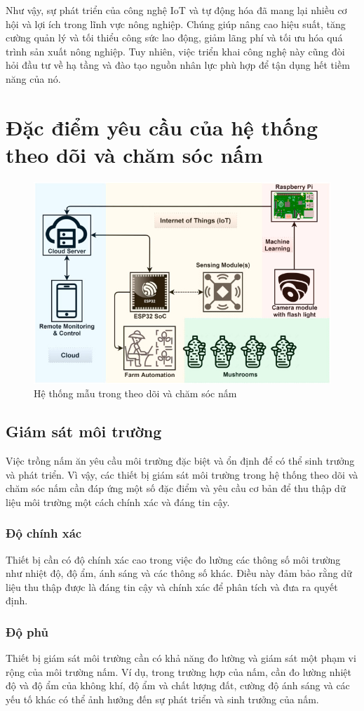 Như vậy, sự phát triển của công nghệ IoT và tự động hóa đã mang lại nhiều cơ hội và lợi ích trong lĩnh vực nông nghiệp. Chúng giúp nâng cao hiệu suất, tăng cường quản lý và tối thiểu công sức lao động, giảm lãng phí và tối ưu hóa quá trình sản xuất nông nghiệp. Tuy nhiên, việc triển khai công nghệ này cũng đòi hỏi đầu tư về hạ tầng và đào tạo nguồn nhân lực phù hợp để tận dụng hết tiềm năng của nó.

\section{Đặc điểm yêu cầu của hệ thống theo dõi và chăm sóc nấm}

\begin{figure}
    \centering
    \includegraphics[width=0.5\linewidth]{images/system-example.png}
    \caption{Hệ thống mẫu trong theo dõi và chăm sóc nấm \cite{RAHMAN2022100267}}
    \label{fig:system-example}
\end{figure}

\subsection{Giám sát môi trường}

Việc trồng nấm ăn yêu cầu môi trường đặc biệt và ổn định để có thể sinh trưởng và phát triển. Vì vậy, các thiết bị giám sát môi trường trong hệ thống theo dõi và chăm sóc nấm cần đáp ứng một số đặc điểm và yêu cầu cơ bản để thu thập dữ liệu môi trường một cách chính xác và đáng tin cậy.

\subsubsection{Độ chính xác}
Thiết bị cần có độ chính xác cao trong việc đo lường các thông số môi trường như nhiệt độ, độ ẩm, ánh sáng và các thông số khác. Điều này đảm bảo rằng dữ liệu thu thập được là đáng tin cậy và chính xác để phân tích và đưa ra quyết định.
\subsubsection{Độ phủ}
Thiết bị giám sát môi trường cần có khả năng đo lường và giám sát một phạm vi rộng của môi trường nấm. Ví dụ, trong trường hợp của nấm, cần đo lường nhiệt độ và độ ẩm của không khí, độ ẩm và chất lượng đất, cường độ ánh sáng và các yếu tố khác có thể ảnh hưởng đến sự phát triển và sinh trưởng của nấm.

